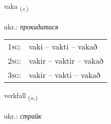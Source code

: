 \documentclass[frontgrid, backgrid]{flacards}\usepackage[]{graphicx}\usepackage[]{xcolor}
\begin{document}
\renewcommand{\flhead}{\vskip5pt \fboxsep=0pt {\small\bfseries\footnotesize Sagnorð | дієслово}}
\renewcommand{\fcfoot}{\vskip5pt \fboxsep=0pt \hspace{2pt}{\small\bfseries\footnotesize 3K}}

\renewcommand{\blhead}{\vskip5pt {\small\bfseries\footnotesize Sagnorð | дієслово }}
\renewcommand{\bcfoot}{\vskip5pt \hspace{2pt}{\small\bfseries\footnotesize 3K}}


{vaka \small{\textsubscript{(\textit{v.})}} \\[1ex] %
\textphonetic{[vaːka]} \\
ukr.: \emph{прокидатися} \\  [2ex]
\renewcommand*{\arraystretch}{0.8}
\begin{tabular}{p{1cm}l}
\textsc{1sg}: & vaki -- vakti -- vakað \\ 
\textsc{2sg}: & vakir -- vaktir -- vakað \\ 
\textsc{3sg}: & vakir -- vakti -- vakað \\ 
\end{tabular}
}

\renewcommand{\flhead}{\vskip5pt \fboxsep=0pt {\small\bfseries\footnotesize Nafnorð | іменник}}
\renewcommand{\fcfoot}{\vskip5pt \fboxsep=0pt \hspace{2pt}{\small\bfseries\footnotesize 3K}}

\renewcommand{\blhead}{\vskip5pt {\small\bfseries\footnotesize Nafnorð | іменник }}
\renewcommand{\bcfoot}{\vskip5pt \hspace{2pt}{\small\bfseries\footnotesize 3K}}


{verkfall \small{\textsubscript{(\textit{n.})}} \\[1ex] %
 \\
ukr.: \emph{страйк} \\  [2ex]
\renewcommand*{\arraystretch}{0.8}
}
\end{document}
